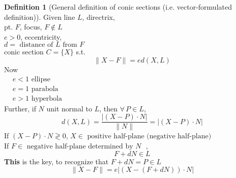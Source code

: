 \documentclass[twoside]{amsart}
\theoremstyle{plain}
\theoremstyle{definition}
\newtheorem{definition}{Definition}
\begin{document}
\begin{definition}[General definition of conic sections (i.e. vector-formulated definition)]\label{D:Conic_Section}
Given line $L$, directrix, \\
\phantom{Given} pt. $F$, focus, $F \notin L$ \\
\phantom{Given} $e > 0$, eccentricity, \\
\phantom{Given} $d = \text{ distance of $L$ from $F$ }$ \\
\phantom{Given} conic section $C = \{ X \}$ s.t. 
\begin{equation}
  \| X - F \| = e d(X,L) 
\end{equation}
Now \\
$\begin{aligned}
  & e < 1 \text{ ellipse } \\
  & e = 1 \text{ parabola } \\
  & e > 1 \text{ hyperbola }
\end{aligned}$ \\
Further, if $N$ unit normal to $L$, then $\forall \, P \in L$, 
\[
d(X,L) = \frac{ | (X-P)\cdot N |}{ \| N \| } = | (X-P)\cdot N | 
\]
If $(X-P)\cdot N \gtrless 0$, $X \in \text{ positive half-plane (negative half-plane) }$ \\

If $F \in \text{ negative half-plane determined by $N$ }$, 
\[
F + dN \in L 
\]
\textbf{ This } is the key, to recognize that $F+ dN = P \in L$  
\begin{equation}
  \| X - F \| = e| (X - (F+ dN ))\cdot N |
\end{equation}  \\


\end{definition}
\end{document}

